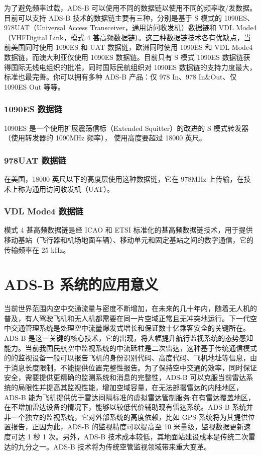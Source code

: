 为了避免频率过载，ADS-B 可以使用不同的数据链以使用不同的频率收/发数据。目前可以支持 ADS-B 技术的数据链主要有三种，分别是基于 S 模式的 1090ES、978UAT（Universal Access Transceiver，通用访问收发机）数据链和 VDL Mode4（VHFDigital Link，模式 4 甚高频数据链）。这三种数据链技术各有优缺点，当前美国同时使用 1090ES 和 UAT 数据链，欧洲同时使用 1090ES 和 VDL Mode4 数据链，而澳大利亚仅使用 1090ES 数据链。目前只有 S 模式 1090ES 数据链获得国际无线电组织的批准，同时国际民航组织对 1090ES 数据链的支持力度最大，标准也最完善。你可以拥有多种 ADS-B 产品：仅 978 In、978 In\&Out、仅 1090ES Out 等等。

\subsubsection{1090ES 数据链}

1090ES 是一个使用扩展震荡信标（Extended Squitter）的改进的 S 模式转发器（使用转发器的 1090MHz 频率），
使用高度要超过 18000 英尺。

\subsubsection{978UAT 数据链}

在美国，18000 英尺以下的高度层使用这种数据链，它在 978MHz 上传输，在技术上称为通用访问收发机（UAT）。

\subsubsection{VDL Mode4 数据链}

模式 4 甚高频数据链是经 ICAO 和 ETSI 标准化的甚高频数据链技术，用于提供移动基站（飞行器和机场地面车辆）、移动单元和固定基站之间的数字通信，它的传输频率在 25 kHz。

\section{ADS-B 系统的应用意义}

当前世界范围内空中交通流量与密度不断增加，在未来的几十年内，随着无人机的普及，有人驾驶飞机和无人机都需要在同一片空域正常且无冲突地运行。下一代空中交通管理系统是处理空中流量爆发式增长和保证数十亿乘客安全的关键所在。ADS-B 是这一关键的核心技术，它的出现，将大幅提升航行监视系统的态势感知能力。当前我国民航空中监视系统的中流砥柱是二次雷达，这种基于传统通信模式的的监视设备一般可以报告飞机的身份识别代码、高度代码、飞机地址等信息，由于消息长度限制，不能提供位置完整性报告。为了保持空中交通的效率，同时保证安全，需要提供更精确的监测系统和消息的完整性，ADS-B 可以克服当前雷达系统的局限性并提高其监视性能，增加空域容量，在无法部署雷达的内陆地区，ADS-B 能为飞机提供优于雷达间隔标准的虚拟雷达管制服务;在有雷达覆盖地区，在不增加雷达设备的情况下，能够以较低代价辅助现有雷达系统。ADS-B 系统并非一个独立的监视系统，它对外部系统的高度依赖，比如 GPS 系统将为其提供位置报告，正因为此，ADS-B 的监视精度可以提高至 10 米量级，监视数据更新速度可达 1 秒 1 次。另外，ADS-B 技术成本较低，其地面站建设成本是传统二次雷达的九分之一。ADS-B 技术将为传统空管监视领域带来重大变革。

